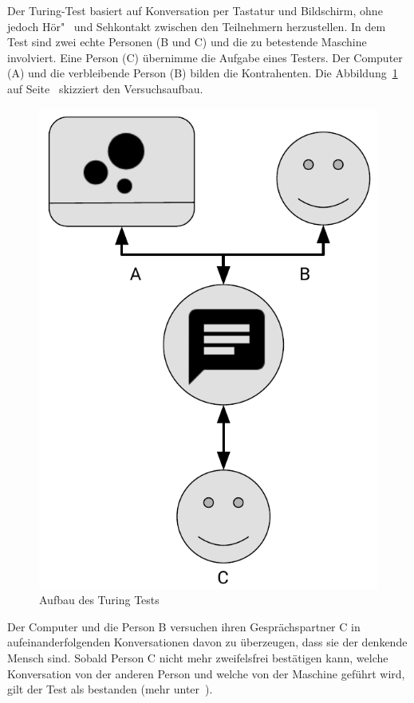 Der Turing-Test basiert auf Konversation per Tastatur und Bildschirm, ohne jedoch Hör"~ und Sehkontakt zwischen den
Teilnehmern herzustellen. In dem Test sind zwei echte Personen (B und C) und die zu betestende Maschine involviert. Eine
Person (C) übernimme die Aufgabe eines Testers. Der Computer (A) und die verbleibende Person (B) bilden die
Kontrahenten. Die Abbildung~\ref{fig:grundlagen_turingtest} auf Seite~\pageref{fig:grundlagen_turingtest} skizziert den
Versuchsaufbau.

\begin{figure}[h]
    \centering
    \includegraphics[scale=0.6]{images/kapitel_2/turing_test.pdf}
    \caption{Aufbau des Turing Tests}
    \label{fig:grundlagen_turingtest}
\end{figure}

Der Computer und die Person B versuchen ihren Gesprächspartner C in aufeinanderfolgenden Konversationen davon zu
überzeugen, dass sie der denkende Mensch sind. Sobald Person C nicht mehr zweifelsfrei bestätigen kann, welche
Konversation von der anderen Person und welche von der Maschine geführt wird, gilt der Test als bestanden (mehr
unter~\cite{online_grundlagen_turing}).

